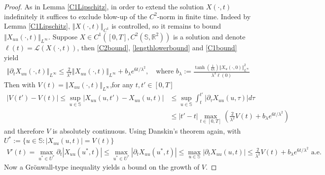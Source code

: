 \documentclass[a4paper,11pt]{amsart}
\theoremstyle{definition}\newtheorem*{definition}{Definition}
\theoremstyle{definition} \newtheorem{proposition}[theorem]{Proposition}
\theoremstyle{definition}\newtheorem{lemma}[theorem]{Lemma}
\theoremstyle{definition}\newtheorem{corollary}[theorem]{Corollary}
\theoremstyle{definition}\newtheorem{example}{Example}
\theoremstyle{remark}\newtheorem*{remark}{Remark}
\def\R{\mathbb{R}}
\def\S{\mathbb{S}}
\newcommand{\norm}[1]{{\left \Vert {#1}\right \Vert}}
\newcommand{\abs}[1]{\left | {#1}\right |}
\def\length{\mathcal L}
\begin{document}
\begin{proof}
As in Lemma \ref{C1Lipschitz}, in order to extend the solution $X(\cdot, t)$ indefinitely it suffices to exclude blow-up of the $C^2$-norm in finite time. Indeed by Lemma \ref{C1Lipschitz}, $\norm{X(\cdot,t)}_{C^1}$ is controlled, so it remains to bound $\norm{X_{uu}(\cdot,t)}_{L^\infty}$. Suppose $X\in C^1([0,T],C^{2}(\S,\R^2))$ is a solution and denote $\ell(t)=\length(X(\cdot, t))$, then \eqref{C2bound}, \eqref{lengthlowerbound} and \eqref{C1bound} yield
\begin{align*}
\norm{\partial_t X_{uu}(\cdot, t)}_{L^\infty}\leq  \frac{2}{\lambda^2}\norm{X_{uu}(\cdot, t)}_{L^\infty}+ b_\lambda e^{6t/\lambda^2}, \quad \text{where } b_\lambda:=\frac{\tanh(\tfrac{1}{4\lambda})\norm{X_u(\cdot,0)}_{L^\infty}^2}{\lambda^3 \ell(0)}
\end{align*}
Then with $V(t)=\norm{X_{uu}(\cdot, t)}_{L^\infty}$,for any $t,t'\in [0,T]$
\begin{align*}
\abs{V(t')-V(t)}  \leq \sup_{u\in \S}\abs{X_{uu}(u,t')-X_{uu}(u,t)}
&\leq \sup_{u\in \S}\int_t^{t'}\abs{\partial_\tau X_{uu}(u, \tau)}d\tau\\
& \leq \abs{t'-t}\max_{t\in [0,T]}\left (\frac{2}{\lambda^2}V(t)+b_\lambda e^{6t/\lambda^2}\right )
\end{align*}
 and therefore $V$ is absolutely continuous. Using Danskin's theorem again, with $U^*:=\{ u\in \S: \abs{X_{uu}(u,t)}=V(t)\}$
\begin{align*}
V'(t)=\max_{u^*\in U^*}\partial_t\abs{X_{uu}(u^*,t)} \leq \max_{u^*\in U^*}\abs{\partial_t X_{uu}(u^*,t)} \leq 
\max_{u\in \S }\abs{\partial_t X_{uu}(u,t)}\leq \frac{2}{\lambda^2}V(t)+b_\lambda e^{6t/\lambda^2} \text{ a.e. }
\end{align*}
Now a Gr\"onwall-type inequality yields a bound on the growth of $V$.
\end{proof}
\end{document}
